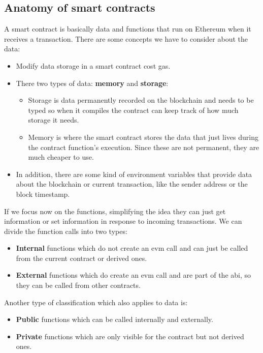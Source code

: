\documentclass[a4paper,12pt]{article}
\begin{document}
\begin{appendices}
{}

\section{Anatomy of smart contracts}
\label{appendix:smart-contract}
{A smart contract is basically data and functions that run on Ethereum when it receives a transaction. There are some concepts we have to consider about the data:
\begin{itemize}
    \item Modify data storage in a smart contract cost gas.
    \item There two types of data: \textbf{memory} and \textbf{storage}:
    \begin{itemize}
        \item Storage is data permanently recorded on the blockchain and needs to be typed so when it compiles the contract can keep track of how much storage it needs.
        \item Memory is where the smart contract stores the data that just lives during the contract function's execution. Since these are not permanent, they are much cheaper to use.
    \end{itemize}
    \item In addition, there are some kind of environment variables that provide data about the blockchain or current transaction, like the sender address or the block timestamp.
\end{itemize}

If we focus now on the functions, simplifying the idea they can just get information or set information in response to incoming transactions. We can divide the function calls into two types:
\begin{itemize}
    \item \textbf{Internal} functions which do not create an \acrshort{evm} call and can just be called from the current contract or derived ones.
    \item \textbf{External} functions which do create an \acrshort{evm} call and are part of the \acrshort{abi}, so they can be called from other contracts.
\end{itemize}

Another type of classification which also applies to data is:
\begin{itemize}
    \item \textbf{Public} functions which can be called internally and externally.
    \item \textbf{Private} functions which are only visible for the contract but not derived ones.
\end{itemize}

}
\end{appendices}
\end{document}
